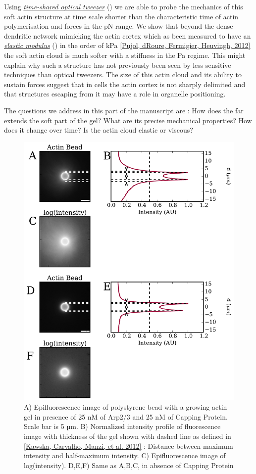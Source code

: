 \documentclass[A4paperpaper,11pt,english]{sphinxmanual}
\begin{document}
Using {\hyperref[index-latex:time-shared-ot]{\emph{time-shared optical tweezer}}} () we are able to probe
the mechanics of this soft actin structure at time scale shorter than the
characteristic time of actin polymerisation and forces in the pN range. We show
that beyond the dense dendritic network mimicking the actin cortex which as
been measured to have an {\hyperref[index-latex:elastic-modulus]{\emph{elastic modulus}}} () in the order of
kPa {\hyperref[index-latex:pujol2012]{{[}Pujol, dRoure, Fermigier, Heuvingh,  2012{]}}} the soft actin cloud is much softer with
a stiffness in the Pa regime.  This might explain why such a
structure has not previously been seen by less sensitive techniques than optical
tweezers. The size of this actin cloud and its ability to sustain forces
suggest that in cells the actin cortex is not sharply delimited and that
structures escaping from it may have a role in organelle positioning.

The questions we address in this part of the manuscript are :  How does the far
extends the soft part of the gel? What are its precise mechanical properties?  How does it change
over time?  Is the actin cloud elastic or viscous?
\begin{figure}[htbp]
\centering
\capstart

\includegraphics[width=0.800\linewidth]{intensity_profile_xnM_Arp_xnM_CP_xmin.pdf}
\caption{A) Epifluorescence image of polystyrene bead with a growing actin gel in
presence of 25 nM of Arp2/3 and 25 nM of Capping Protein. Scale bar is 5
µm.  B) Normalized intensity profile of fluorescence image with thickness
of the gel shown with dashed line as defined in {\hyperref[index-latex:kawska2012]{{[}Kawska, Carvalho, Manzi,  et al.  2012{]}}} :
Distance between maximum intensity and half-maximum intensity.  C)
Epifluorescence image of log(intensity). D,E,F) Same as A,B,C, in absence
of Capping Protein}\label{index-latex:fig-intensity-profile}\end{figure}
\end{document}
